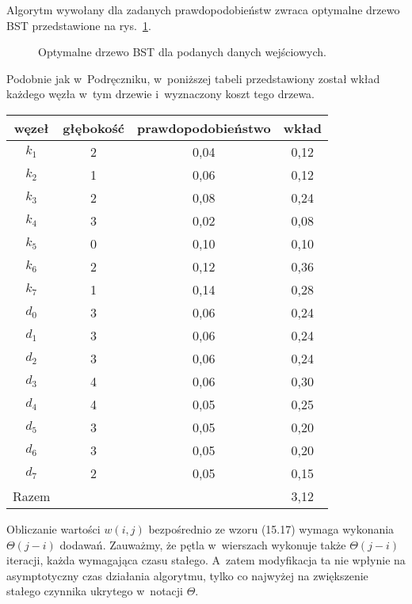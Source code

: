 \exercise %
Algorytm  wywołany dla zadanych prawdopodobieństw zwraca optymalne drzewo BST przedstawione na rys.\ \ref{fig:15.5-2}.
\begin{figure}[!ht]
	\centering 
	\caption{Optymalne drzewo BST dla podanych danych wejściowych.} \label{fig:15.5-2}
\end{figure}
Podobnie jak w~Podręczniku, w~poniższej tabeli przedstawiony został wkład każdego węzła w~tym drzewie i~wyznaczony koszt tego drzewa.
\begin{table}[!ht]
	\centering
		\begin{tabular}{cccc}
			węzeł & głębokość & prawdopodobieństwo & wkład \\ \hline
			$k_1$ & 2 & 0{,}04 & 0{,}12 \\
			$k_2$ & 1 & 0{,}06 & 0{,}12 \\
			$k_3$ & 2 & 0{,}08 & 0{,}24 \\
			$k_4$ & 3 & 0{,}02 & 0{,}08 \\
			$k_5$ & 0 & 0{,}10 & 0{,}10 \\
			$k_6$ & 2 & 0{,}12 & 0{,}36 \\
			$k_7$ & 1 & 0{,}14 & 0{,}28 \\
			$d_0$ & 3 & 0{,}06 & 0{,}24 \\
			$d_1$ & 3 & 0{,}06 & 0{,}24 \\
			$d_2$ & 3 & 0{,}06 & 0{,}24 \\
			$d_3$ & 4 & 0{,}06 & 0{,}30 \\
			$d_4$ & 4 & 0{,}05 & 0{,}25 \\
			$d_5$ & 3 & 0{,}05 & 0{,}20 \\
			$d_6$ & 3 & 0{,}05 & 0{,}20 \\
			$d_7$ & 2 & 0{,}05 & 0{,}15 \\ \hline
			Razem & & & 3{,}12
		\end{tabular}
\end{table}

\exercise %
Obliczanie wartości $w(i,j)$ bezpośrednio ze wzoru (15.17) wymaga wykonania $\Theta(j-i)$ dodawań.
Zauważmy, że pętla  w~wierszach  wykonuje także $\Theta(j-i)$ iteracji, każda wymagająca czasu stałego.
A~zatem modyfikacja ta nie wpłynie na asymptotyczny czas działania algorytmu, tylko co najwyżej na zwiększenie stałego czynnika ukrytego w~notacji $\Theta$.


